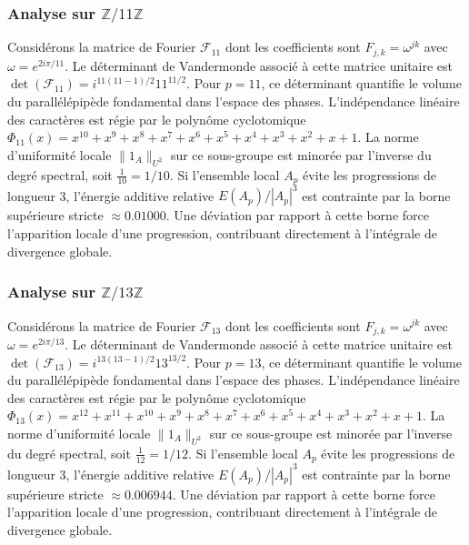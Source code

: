\documentclass[11pt,a4paper]{article}
\begin{document}
\subsubsection{Analyse sur $\mathbb{Z}/11\mathbb{Z}$}
Considérons la matrice de Fourier $\mathcal{F}_{11}$ dont les coefficients sont $F_{j, k} = \omega^{j k}$ avec $\omega = e^{2i\pi/11}$. Le déterminant de Vandermonde associé à cette matrice unitaire est $\det(\mathcal{F}_{11}) = i^{11(11-1)/2} 11^{11/2}$. Pour $p = 11$, ce déterminant quantifie le volume du parallélépipède fondamental dans l'espace des phases. L'indépendance linéaire des caractères est régie par le polynôme cyclotomique $\Phi_{11}(x) = x^{10} + x^{9} + x^{8} + x^{7} + x^{6} + x^{5} + x^{4} + x^{3} + x^{2} + x + 1$. La norme d'uniformité locale $\|1_A\|_{U^2}$ sur ce sous-groupe est minorée par l'inverse du degré spectral, soit $\frac{1}{10} = 1/10$. Si l'ensemble local $A_p$ évite les progressions de longueur 3, l'énergie additive relative $E(A_p) / |A_p|^3$ est contrainte par la borne supérieure stricte $\approx 0.01000$. Une déviation par rapport à cette borne force l'apparition locale d'une progression, contribuant directement à l'intégrale de divergence globale.
\subsubsection{Analyse sur $\mathbb{Z}/13\mathbb{Z}$}
Considérons la matrice de Fourier $\mathcal{F}_{13}$ dont les coefficients sont $F_{j, k} = \omega^{j k}$ avec $\omega = e^{2i\pi/13}$. Le déterminant de Vandermonde associé à cette matrice unitaire est $\det(\mathcal{F}_{13}) = i^{13(13-1)/2} 13^{13/2}$. Pour $p = 13$, ce déterminant quantifie le volume du parallélépipède fondamental dans l'espace des phases. L'indépendance linéaire des caractères est régie par le polynôme cyclotomique $\Phi_{13}(x) = x^{12} + x^{11} + x^{10} + x^{9} + x^{8} + x^{7} + x^{6} + x^{5} + x^{4} + x^{3} + x^{2} + x + 1$. La norme d'uniformité locale $\|1_A\|_{U^2}$ sur ce sous-groupe est minorée par l'inverse du degré spectral, soit $\frac{1}{12} = 1/12$. Si l'ensemble local $A_p$ évite les progressions de longueur 3, l'énergie additive relative $E(A_p) / |A_p|^3$ est contrainte par la borne supérieure stricte $\approx 0.006944$. Une déviation par rapport à cette borne force l'apparition locale d'une progression, contribuant directement à l'intégrale de divergence globale.
\end{document}

